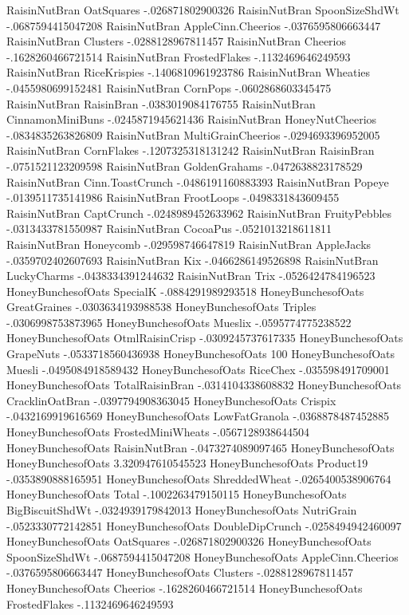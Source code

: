 RaisinNutBran	OatSquares	-.026871802900326
RaisinNutBran	SpoonSizeShdWt	-.0687594415047208
RaisinNutBran	AppleCinn.Cheerios	-.0376595806663447
RaisinNutBran	Clusters	-.0288128967811457
RaisinNutBran	Cheerios	-.1628260466721514
RaisinNutBran	FrostedFlakes	-.1132469646249593
RaisinNutBran	RiceKrispies	-.1406810961923786
RaisinNutBran	Wheaties	-.0455980699152481
RaisinNutBran	CornPops	-.0602868603345475
RaisinNutBran	RaisinBran	-.0383019084176755
RaisinNutBran	CinnamonMiniBuns	-.0245871945621436
RaisinNutBran	HoneyNutCheerios	-.0834835263826809
RaisinNutBran	MultiGrainCheerios	-.0294693396952005
RaisinNutBran	CornFlakes	-.1207325318131242
RaisinNutBran	RaisinBran	-.0751521123209598
RaisinNutBran	GoldenGrahams	-.0472638823178529
RaisinNutBran	Cinn.ToastCrunch	-.0486191160883393
RaisinNutBran	Popeye	-.0139511735141986
RaisinNutBran	FrootLoops	-.0498331843609455
RaisinNutBran	CaptCrunch	-.0248989452633962
RaisinNutBran	FruityPebbles	-.0313433781550987
RaisinNutBran	CocoaPus	-.0521013218611811
RaisinNutBran	Honeycomb	-.029598746647819
RaisinNutBran	AppleJacks	-.0359702402607693
RaisinNutBran	Kix	-.0466286149526898
RaisinNutBran	LuckyCharms	-.0438334391244632
RaisinNutBran	Trix	-.0526424784196523
HoneyBunchesofOats	SpecialK	-.0884291989293518
HoneyBunchesofOats	GreatGraines	-.0303634193988538
HoneyBunchesofOats	Triples	-.0306998753873965
HoneyBunchesofOats	Mueslix	-.0595774775238522
HoneyBunchesofOats	OtmlRaisinCrisp	-.0309245737617335
HoneyBunchesofOats	GrapeNuts	-.0533718560436938
HoneyBunchesofOats	100%
HoneyBunchesofOats	Muesli	-.0495084918589432
HoneyBunchesofOats	RiceChex	-.035598491709001
HoneyBunchesofOats	TotalRaisinBran	-.0314104338608832
HoneyBunchesofOats	CracklinOatBran	-.0397794908363045
HoneyBunchesofOats	Crispix	-.0432169919616569
HoneyBunchesofOats	LowFatGranola	-.0368878487452885
HoneyBunchesofOats	FrostedMiniWheats	-.0567128938644504
HoneyBunchesofOats	RaisinNutBran	-.0473274089097465
HoneyBunchesofOats	HoneyBunchesofOats	3.320947610545523
HoneyBunchesofOats	Product19	-.0353890888165951
HoneyBunchesofOats	ShreddedWheat	-.0265400538906764
HoneyBunchesofOats	Total	-.1002263479150115
HoneyBunchesofOats	BigBiscuitShdWt	-.0324939179842013
HoneyBunchesofOats	NutriGrain	-.0523330772142851
HoneyBunchesofOats	DoubleDipCrunch	-.0258494942460097
HoneyBunchesofOats	OatSquares	-.026871802900326
HoneyBunchesofOats	SpoonSizeShdWt	-.0687594415047208
HoneyBunchesofOats	AppleCinn.Cheerios	-.0376595806663447
HoneyBunchesofOats	Clusters	-.0288128967811457
HoneyBunchesofOats	Cheerios	-.1628260466721514
HoneyBunchesofOats	FrostedFlakes	-.1132469646249593
